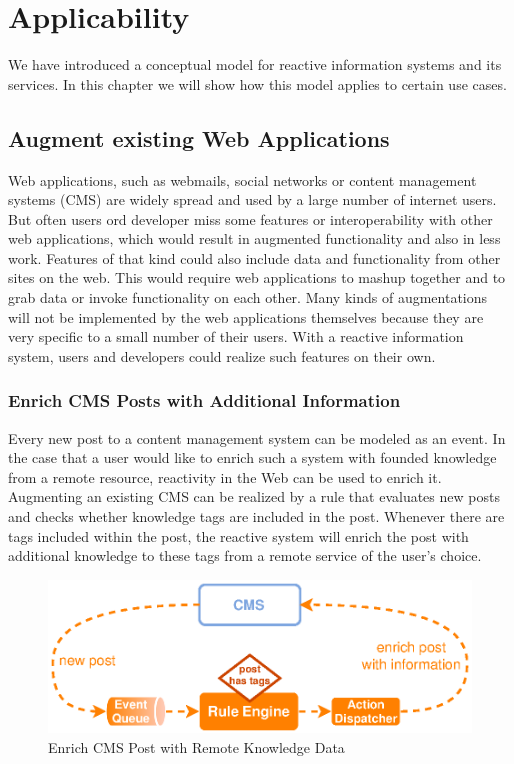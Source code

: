\chapter{Applicability}
We have introduced a conceptual model for reactive information systems and its services.
In this chapter we will show how this model applies to certain use cases.

\section{Augment existing Web Applications}
Web applications, such as webmails, social networks or content management systems (\textrm{CMS}) are widely spread and used by a large number of internet users.
But often users ord developer miss some features or interoperability with other web applications, which would result in augmented functionality and also in less work.
Features of that kind could also include data and functionality from other sites on the web.
This would require web applications to mashup together and to grab data or invoke functionality on each other.
Many kinds of augmentations will not be implemented by the web applications themselves because they are very specific to a small number of their users.
With a reactive information system, users and developers could realize such features on their own.

\subsection{Enrich \textrm{CMS} Posts with Additional Information}
Every new post to a content management system can be modeled as an event.
In the case that a user would like to enrich such a system with founded knowledge from a remote resource, reactivity in the Web can be used to enrich it.
Augmenting an existing \textrm{CMS} can be realized by a rule that evaluates new posts and checks whether knowledge tags are included in the post.
Whenever there are tags included within the post, the reactive system will enrich the post with additional knowledge to these tags from a remote service of the user's choice.
\begin{figure}[!ht]
  \centering
  \includegraphics{figures/ProBinderAnnotations}
  \caption{Enrich CMS Post with Remote Knowledge Data}
  \label{fig:ProBinderAnnotations}
\end{figure}

